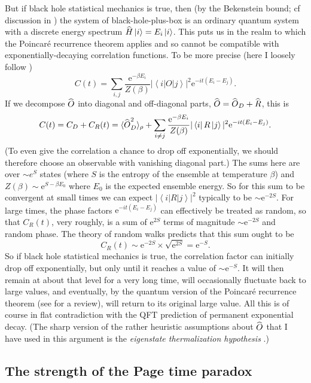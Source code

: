 \documentclass{article}
\newcommand{\ket}[1]{\ensuremath{\left|  #1 \right\rangle}}
\newcommand{\bra}[1]{\ensuremath{\left\langle #1 \right|}}
\newcommand{\matel}[3]{\ensuremath{\bra{#1} #2 \ket{#3}}}
\newcommand{\op}[1]{\ensuremath{\widehat{\textsf{\ensuremath{#1}}}}}
\newcommand{\be}{\begin{equation}}
\newcommand{\ee}{\end{equation}}
\newcommand{\e}[1]{\mathrm{e}^{#1}}
\begin{document}
But if black hole statistical mechanics is true, then (by the Bekenstein bound; cf discussion in ) the system of black-hole-plus-box is an ordinary quantum system with a discrete energy spectrum $\op{H}\ket{i}=E_i\ket{i}$. This puts us in the realm to which the Poincar\'{e} recurrence theorem applies and so cannot be compatible with exponentially-decaying correlation functions. To be more precise (here I loosely follow ) 
\be 
C(t)=\sum_{i,j}  \frac{\e{-\beta E_i}}{Z(\beta)}|\matel{i}{O}{j}|^2 \e{-it(E_i-E_j)}.
\ee
If we decompose $\op{O}$ into diagonal and off-diagonal parts, $\op{O}=\op{O}_D + \op{R}$, this is
\be \label{correlation}
C(t) = C_D + C_R(t)= \langle \op{O}_D^2 \rangle_\rho + \sum_{i\neq j}\frac{\e{-\beta E_i}}{Z(\beta)}|\matel{i}{R}{j}|^2 \e{-it(E_i-E_j)}.
\ee
(To even give the correlation a chance to drop off exponentially, we should therefore choose an observable with vanishing diagonal part.)
The sums here are over $\sim e^S$ states (where $S$ is the entropy of the ensemble at temperature $\beta$) and $Z(\beta)\sim \e{S-\beta E_0}$ where $E_0$ is the expected ensemble energy. So for this sum to be convergent at small times we can expect $|\matel{i}{R}{j}|^2$ typically to be $\sim \e{-2S}$. For large times, the phase factors $\e{-it(E_i-E_j)}$ can effectively be treated as random, so that $C_R(t)$, very roughly, is a sum of $\e{2S}$ terms of magnitude $\sim \e{-2S}$ and random phase. The theory of random walks predicts that this sum ought to be
\be
C_R(t) \sim \e{-2S} \times \sqrt{\e{2S}} = \e{-S}.
\ee
So if black hole statistical mechanics is true, the correlation factor can initially drop off exponentially, but only until it reaches a value of $\sim\e{-S}$. It will then remain at about that level for a very long time, will occasionally fluctuate back to large values, and eventually, by the quantum version of the Poincar\'{e} recurrence theorem (see  for a review), will return to its original large value. All this is of course in flat contradiction with the QFT prediction of permanent exponential decay. (The sharp version of the rather heuristic assumptions about $\op{O}$ that I have used in this argument is the \emph{eigenstate thermalization hypothesis} \cite{srednicki-thermalisation}.)



\subsection{The strength of the Page time paradox}
\end{document}
